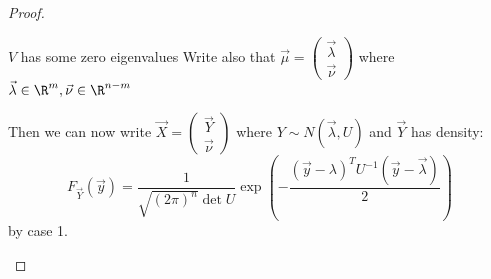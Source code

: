 \documentclass[../Main.tex]{subfiles}
\begin{document}
\begin{proof}
\begin{case}{$V$ has some zero eigenvalues}
        Write also that $\vec{\mu} = \begin{pmatrix}\vec{\lambda} \\ \vec{\nu}\end{pmatrix}$ where $\vec{\lambda} \in \R^m, \vec{\nu} \in \R^{n-m}$

        Then we can now write $\vec{X} = \begin{pmatrix} \vec{Y} \\ \vec{\nu}\end{pmatrix}$ where $Y \sim N(\vec{\lambda}, U)$ and $\vec{Y}$ has density:
        \begin{equation*}
            F_{\vec{Y}}(\vec{y}) = \frac{1}{\sqrt{(2\pi)^n} \det{U}} \exp\left(-\frac{(\vec{y} -\lambda)^T U^{-1} (\vec{y} - \vec{\lambda})}{2}\right)
        \end{equation*}
        by case 1.
    \end{case}
\end{proof}
\end{document}
